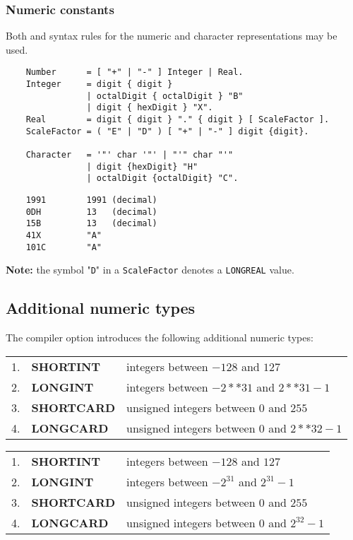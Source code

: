 \subsubsection{Numeric constants}

\mextonly

Both \mt{} and \ot{}  syntax rules for the numeric and character
representations may be used.

\begin{verbatim}
    Number      = [ "+" | "-" ] Integer | Real.
    Integer     = digit { digit }
                | octalDigit { octalDigit } "B"
                | digit { hexDigit } "X".
    Real        = digit { digit } "." { digit } [ ScaleFactor ].
    ScaleFactor = ( "E" | "D" ) [ "+" | "-" ] digit {digit}.

    Character   = '"' char '"' | "'" char "'"
                | digit {hexDigit} "H"
                | octalDigit {octalDigit} "C".
\end{verbatim}

\Examples
\begin{verbatim}
    1991        1991 (decimal)
    0DH         13   (decimal)
    15B         13   (decimal)
    41X         "A"
    101C        "A"
\end{verbatim}

{\bf Note:} the symbol "\verb'D'" in a \verb'ScaleFactor'
denotes a \verb'LONGREAL' value.

\subsection{Additional numeric types}\label{m2:ext:numeric}

\maddonly

The compiler option  introduces
the following additional numeric types:

\ifonline
\begin{flushleft}
\begin{tabular}{lll}
1. &\bf SHORTINT  & integers between $-128$ and $127$           \\
2. &\bf LONGINT   & integers between $-2**31$ and $2**31-1$     \\
3. &\bf SHORTCARD & unsigned integers between $0$ and $255$     \\
4. &\bf LONGCARD  & unsigned integers between $0$ and $2**32-1$ \\
\end{tabular}
\end{flushleft}
\else
\begin{flushleft}
\begin{tabular}{lll}
1. &\bf SHORTINT  & integers between $-128$ and $127$            \\
2. &\bf LONGINT   & integers between $-2^{31}$ and $2^{31}-1$    \\
3. &\bf SHORTCARD & unsigned integers between $0$ and $255$      \\
4. &\bf LONGCARD  & unsigned integers between $0$ and $2^{32}-1$ \\
\end{tabular}
\end{flushleft}
\fi

